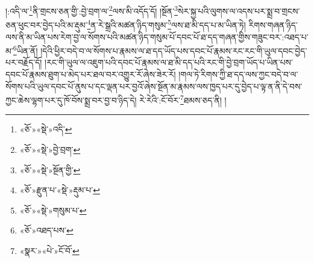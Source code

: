 །:འདི་ལ་\footnote{«ཅོ་»«སྡེ་»འདི་}ནི་གྲངས་ཅན་གྱི་:བྱེ་བྲག་ལ་\footnote{«ཅོ་»«སྡེ་»བྱེ་བྲག་}ལས་མི་འདོད་དོ། །སྔོན་\footnote{«ཅོ་»«སྡེ་»སྔོན་གྱི་}སེར་སྐྱ་པའི་ལུགས་ལ་འདས་པར་སྨྲ་བ་གྲངས་ཅན་ཕུང་བར་བྱེད་པའི་མ་རྡུམ་\footnote{«ཅོ་»རྫུན་པ་«སྡེ་»རྡུམ་པ་}ན་རེ་སྒྲའི་མཚན་ཉིད་གསུམ་\footnote{«ཅོ་»«སྡེ་»གསུམ་པ་}ལས་ཐ་མི་དད་པ་མ་ཡིན་ཏེ། རིགས་གཞན་ཉིད་ལས་ནི་མ་ཡིན་པས་རེག་བྱ་ལ་སོགས་པའི་མཚན་ཉིད་གསུམ་པོ་དབང་པོ་ཐ་དད་གཞན་གྱིས་གཟུང་བར་:འཐད་པ་མ་\footnote{«ཅོ་»འཐད་པས་}ཡིན་ནོ། །དེའི་ཕྱིར་བདེ་བ་ལ་སོགས་པ་རྣམས་ལ་ཐ་དད་ཡོད་པས་དབང་པོ་རྣམས་རང་རང་གི་ཡུལ་དབང་བྱེད་པར་བརྗོད་དོ། །རང་གི་ཡུལ་ལ་འཇུག་པའི་དབང་པོ་རྣམས་ལ་ཐ་མི་དད་པའི་རང་གི་བྱེ་བྲག་ཡོད་པ་ཡིན་པས་དབང་པོ་རྣམས་ཐུག་པ་མེད་པར་ཐལ་བར་འགྱུར་རོ་ཞེས་ཟེར་རོ། །གལ་ཏེ་རིགས་ཀྱི་ཐ་དད་ལས་ཀྱང་བདེ་བ་ལ་སོགས་པའི་ཡུལ་དབང་པོ་ནུས་པ་དང་ལྡན་པར་བྱའོ་ཞེས་སྔོན་མ་རྣམས་ལས་ཁྱད་པར་དུ་བྱེད་པ་ལྟ་ན་ནི་དེ་བས་ཀྱང་ཆེས་ལྷག་པར་དུ་ཁོ་བོས་སྨྲ་བར་བྱ་བ་ཉིད་དེ། རེ་རེའི་:ངོ་བོར་\footnote{«སྣར་»«པེ་»ངོ་བོ་}ཐམས་ཅད་ནི། །
